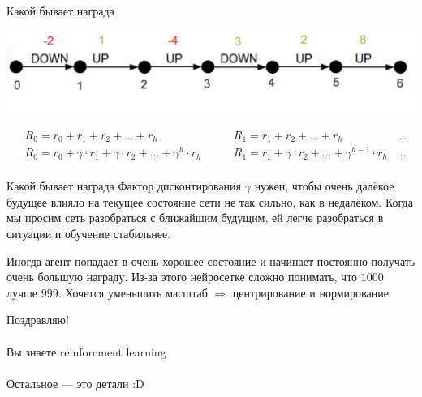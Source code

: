 \documentclass[notes,12pt, aspectratio=169]{beamer}
\begin{document}
\begin{frame}{Какой бывает награда}
\begin{center}
	\includegraphics[width=.7\linewidth]{states_1.png}
\end{center}
\begin{equation*}
\begin{aligned}
&R_0 = r_0 + r_1 + r_2 + \ldots + r_{h}  & \qquad  R_1 = r_1 + r_2 + \ldots + r_{h} & \ldots \\
&R_0 = r_0 + \gamma \cdot r_1 + \gamma \cdot r_2 + \ldots +  \gamma^h \cdot r_{h}  & \qquad  R_1 = r_1 + \gamma \cdot r_2 + \ldots + \gamma^{h-1} \cdot r_{h} & \ldots \\
\end{aligned} 
\end{equation*}
\end{frame}


\begin{frame}{Какой бывает награда}
\alert{Фактор дисконтирования $\gamma$} нужен, чтобы очень далёкое будущее влияло на текущее состояние сети не так сильно, как в недалёком. Когда мы просим сеть разобраться с ближайшим будущим, ей легче разобраться в ситуации и обучение стабильнее. 

\vfill 

Иногда агент попадает в очень хорошее состояние и начинает постоянно получать очень большую награду. Из-за этого нейросетке сложно понимать, что $1000$ лучше $999$. Хочется уменьшить масштаб $\Rightarrow$ центрирование и нормирование 
\end{frame}


\begin{frame}
\begin{center}
\alert{\Huge Поздравляю!  \\  \mbox{ }  \\  Вы знаете reinforcment learning \\  \mbox{ }  \\ Остальное — это детали :D } 
\end{center}
\end{frame}
\end{document}
